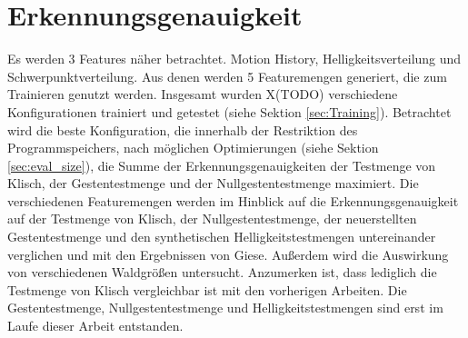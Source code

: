 \section{Erkennungsgenauigkeit}
Es werden 3 Features näher betrachtet. Motion History, Helligkeitsverteilung und Schwerpunktverteilung. Aus denen werden 5 Featuremengen generiert, die zum Trainieren genutzt werden. Insgesamt wurden X(TODO)
verschiedene Konfigurationen trainiert und getestet (siehe Sektion \ref{sec:Training}).
\newline
\newline
Betrachtet wird die beste Konfiguration, die innerhalb der Restriktion des Programmspeichers, nach möglichen Optimierungen (siehe Sektion \ref{sec:eval_size}), die Summe der Erkennungsgenauigkeiten
der Testmenge von Klisch, der Gestentestmenge und der Nullgestentestmenge maximiert.
\newline
\newline
Die verschiedenen Featuremengen werden im Hinblick auf die Erkennungsgenauigkeit auf der Testmenge von Klisch, der Nullgestentestmenge, der neuerstellten Gestentestmenge und den synthetischen
Helligkeitstestmengen untereinander verglichen und mit den Ergebnissen von Giese. Außerdem wird die Auswirkung von verschiedenen Waldgrößen untersucht. Anzumerken ist, dass lediglich die
Testmenge von Klisch vergleichbar ist mit den vorherigen Arbeiten. Die Gestentestmenge, Nullgestentestmenge und Helligkeitstestmengen sind erst im Laufe dieser Arbeit entstanden.







